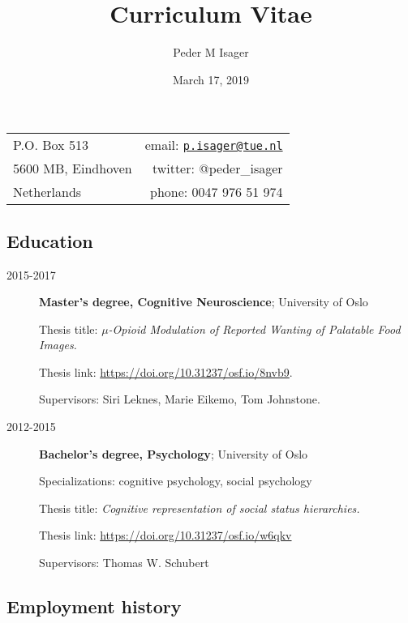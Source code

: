 \documentclass[]{article}
\title{Curriculum Vitae}
\author{Peder M Isager}
\date{March 17, 2019}
\begin{document}
\maketitle

\begin{longtable}[]{@{}lr@{}}
\toprule
P.O. Box 513 & email:
\href{mailto:p.isager@tue.nl}{\nolinkurl{p.isager@tue.nl}}\tabularnewline
5600 MB, Eindhoven & twitter: @peder\_isager\tabularnewline
Netherlands & phone: 0047 976 51 974\tabularnewline
\bottomrule
\end{longtable}

\subsection{Education}\label{education}

\begin{description}
\item[2015-2017]
\textbf{Master's degree, Cognitive Neuroscience}; University of Oslo

Thesis title: \emph{\(\mu\)-Opioid Modulation of Reported Wanting of
Palatable Food Images.}

Thesis link: \url{https://doi.org/10.31237/osf.io/8nvb9}.

Supervisors: Siri Leknes, Marie Eikemo, Tom Johnstone.\\
\item[2012-2015]
\textbf{Bachelor's degree, Psychology}; University of Oslo

Specializations: cognitive psychology, social psychology

Thesis title: \emph{Cognitive representation of social status
hierarchies.}

Thesis link: \url{https://doi.org/10.31237/osf.io/w6qkv}

Supervisors: Thomas W. Schubert
\end{description}

\subsection{Employment history}\label{employment-history}
\end{document}
